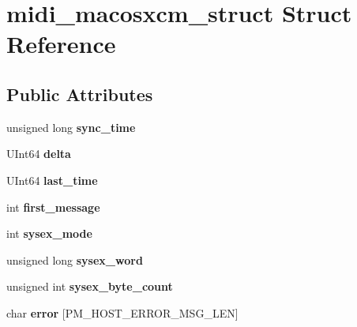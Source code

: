\hypertarget{structmidi__macosxcm__struct}{}\section{midi\+\_\+macosxcm\+\_\+struct Struct Reference}
\label{structmidi__macosxcm__struct}
\subsection*{Public Attributes}
\begin{DoxyCompactItemize}
\item 
\mbox{\label{structmidi__macosxcm__struct_aa58c4281cdff6c589feb7f8cac66d394}} 
unsigned long {\bfseries sync\+\_\+time}
\item 
\mbox{\label{structmidi__macosxcm__struct_a1527198c35538ef24e96c65380ca0108}} 
U\+Int64 {\bfseries delta}
\item 
\mbox{\label{structmidi__macosxcm__struct_a303a040d9baf5a9392a4f9064897a1da}} 
U\+Int64 {\bfseries last\+\_\+time}
\item 
\mbox{\label{structmidi__macosxcm__struct_ae0cd7eb4fc4b045a42d7942430bf79a8}} 
int {\bfseries first\+\_\+message}
\item 
\mbox{\label{structmidi__macosxcm__struct_a097c1c396255f76cbddcc4aef7d6b0de}} 
int {\bfseries sysex\+\_\+mode}
\item 
\mbox{\label{structmidi__macosxcm__struct_a876133d8c76c7db7ac1cc518cd4d9af3}} 
unsigned long {\bfseries sysex\+\_\+word}
\item 
\mbox{\label{structmidi__macosxcm__struct_ade8670d4eebab36dded3bca84980a723}} 
unsigned int {\bfseries sysex\+\_\+byte\+\_\+count}
\item 
\mbox{\label{structmidi__macosxcm__struct_a3f02ae6688373ea4ed28a69129453a7e}} 
char {\bfseries error} \mbox{[}P\+M\+\_\+\+H\+O\+S\+T\+\_\+\+E\+R\+R\+O\+R\+\_\+\+M\+S\+G\+\_\+\+L\+EN\mbox{]}

\end{DoxyCompactItemize}

